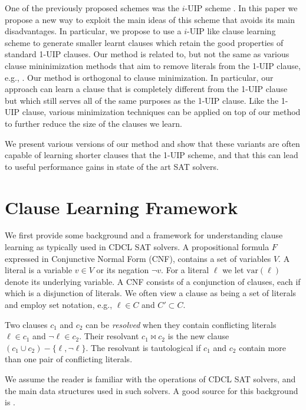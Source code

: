 \documentclass[runningheads]{llncs}
\newcommand{\sat}{SAT\xspace}
\newcommand{\var}{\text{var}}
\newcommand{\resolve}{\bowtie}
\begin{document}
One of the previously proposed schemes was the $i$-UIP scheme
\cite{DBLP:conf/iccad/ZhangMMM01}. In this paper we propose a new way
to exploit the main ideas of this scheme that avoids its main
disadvantages. In particular, we propose to use a $i$-UIP like clause
learning scheme to generate smaller learnt clauses which retain the
good properties of standard 1-UIP clauses. Our method is related to,
but not the same as various clause mininimization methods that aim to
remove literals from the 1-UIP clause, e.g.,
\cite{DBLP:conf/sat/SorenssonB09,DBLP:conf/ijcai/LuoLXML17,DBLP:conf/sat/WieringaH13}.
Our method is orthogonal to clause minimization. In particular, 
our approach can learn a clause that is completely different from the
1-UIP clause but which still serves all of the same purposes as the 1-UIP
clause. Like the 1-UIP clause, various minimization techniques can be
applied on top of our method to further reduce the size of the clauses
we learn.

We present various versions of our method and show that these variants
are often capable of learning shorter clauses that the 1-UIP scheme,
and that this can lead to useful performance gains in state of the art
\sat solvers.

\section{Clause Learning Framework}
We first provide some background and a framework for understanding
clause learning as typically used in CDCL \sat solvers. A
propositional formula $F$ expressed in Conjunctive Normal Form (CNF),
contains a set of variables $V$. A literal is a variable $v\in V$ or
its negation $\lnot v$. For a literal $\ell$ we let $\var(\ell)$
denote its underlying variable. A CNF consists of a conjunction of
clauses, each if which is a disjunction of literals. We often view a
clause as being a set of literals and employ set notation, e.g.,
$\ell\in C$ and $C'\subset C$. 

Two clauses $c_1$ and $c_2$ can be \textit{resolved} when they contain
conflicting literals $\ell\in c_1$ and $\lnot \ell \in c_2$. Their
resolvant $c_1 \resolve c_2$ is the new clause
$(c_1 \cup c_2) - \{\ell, \lnot \ell\}$. The resolvant is tautological
if $c_1$ and $c_2$ contain more than one pair of conflicting literals.

We assume the reader is familiar with the operations of CDCL \sat
solvers, and the main data structures used in such solvers. A good
source for this background is \cite{DBLP:series/faia/SilvaLM09}.
\end{document}
